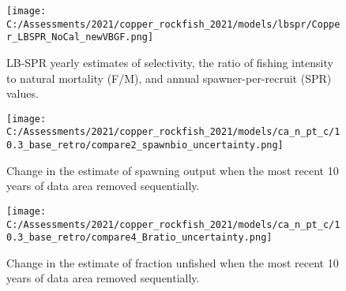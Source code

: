 \documentclass[11pt,
  english,
  a4paper,
]{article}
\begin{document}
\tagmcend\tagstructend

\newpage


\begin{figure}
\centering
\texttt{[image: C:/Assessments/2021/copper\_rockfish\_2021/models/lbspr/Copper\_LBSPR\_NoCal\_newVBGF.png]}
\caption{LB-SPR yearly estimates of selectivity, the ratio of fishing intensity to natural mortality (F/M), and annual spawner-per-recruit (SPR) values.\label{fig:lbspr}}
\end{figure}

\tagmcend\tagstructend

\newpage


\begin{figure}
\centering
\texttt{[image: C:/Assessments/2021/copper\_rockfish\_2021/models/ca\_n\_pt\_c/10.3\_base\_retro/compare2\_spawnbio\_uncertainty.png]}
\caption{Change in the estimate of spawning output when the most recent 10 years of data area removed sequentially.\label{fig:retro-ssb}}
\end{figure}

\tagmcend\tagstructend


\begin{figure}
\centering
\texttt{[image: C:/Assessments/2021/copper\_rockfish\_2021/models/ca\_n\_pt\_c/10.3\_base\_retro/compare4\_Bratio\_uncertainty.png]}
\caption{Change in the estimate of fraction unfished when the most recent 10 years of data area removed sequentially.\label{fig:retro-depl}}
\end{figure}

\tagmcend\tagstructend

\end{document}
